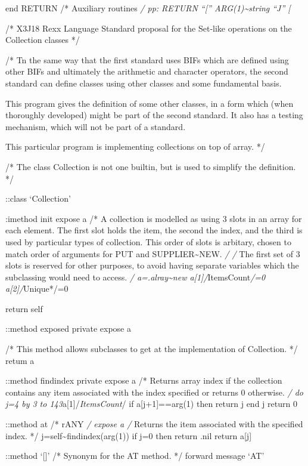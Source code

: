 end RETURN /* Auxiliary routines \emph{/ pp: RETURN ``{[}''
\textbar\textbar{} ARG(1)\textasciitilde string \textbar\textbar{} ``J''
{[}}

/* X3J18 Rexx Language Standard proposal for the Set-like operations on
the Collection classes */

/* Tn the same way that the first standard uses BIFs which are defined
using other BIFs and ultimately the arithmetic and character operators,
the second standard can define classes using other classes and some
fundamental basis.

This program gives the definition of some other classes, in a form which
(when thoroughly developed) might be part of the second standard. It
also has a testing mechanism, which will not be part of a standard.

This particular program is implementing collections on top of array. */

/* The class Collection is not one builtin, but is used to simplify the
definition. */

::class `Collection'

:imethod init expose a /* A collection is modelled as using 3 slots in
an array for each element. The first slot holds the item, the second the
index, and the third is used by particular types of collection. This
order of slots is arbitary, chosen to match order of arguments for PUT
and SUPPLIER\textasciitilde NEW. \emph{/ /} The first set of 3 slots is
reserved for other purposes, to avoid having separate variables which
the subclassing would need to access. \emph{/
a=.alray\textasciitilde new a{[}1{]}/}ItemsCount\emph{/=0
a{[}2{]}/}Unique*/=0

return self

::method exposed private expose a

/* This method allows subclasses to get at the implementation of
Collection. */ retum a

::method findindex private expose a /* Returns array index if the
collection contains any item associated with the index specified or
returns 0 otherwise. \emph{/ do j=4 by 3 to
143}a{[}1{]}/\emph{ItemsCount}/ if a{[}j+1{]}==arg(1) then return j end
j return 0

::method at /* rANY \emph{/ expose a /} Returns the item associated with
the specified index. */ j=self\textasciitilde findindex(arg(1)) if j=0
then return .nil return a{[}j{]}

::method `{[}{]}' /* Synonym for the AT method. */ forward message `AT'

